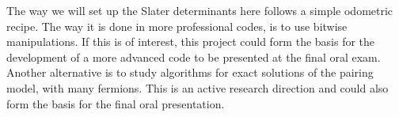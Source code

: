 \documentclass[prc]{revtex4}
\begin{document}
The way we will set up the Slater determinants here follows a simple odometric recipe. The way it is done in more professional codes, is to use bitwise manipulations. If this is of interest, this project could form the basis for the development of a more advanced code
to be presented at the final oral exam. Another alternative is to study algorithms for exact solutions of the pairing model, with many fermions.  This is an active research direction and could also form the basis for the final oral presentation.  
\end{document}
